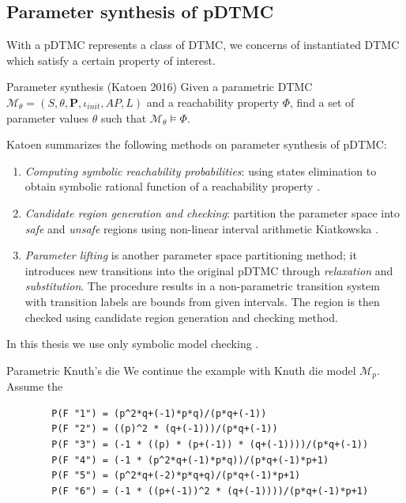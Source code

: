 \subsection{Parameter synthesis of pDTMC}
With a pDTMC represents a class of DTMC, we concerns of instantiated DTMC which satisfy a certain property of interest.
\begin{definition}{Parameter synthesis (Katoen 2016)\cite{katoen2016probabilistic}} Given a
      parametric DTMC $\mathcal{M}_\theta = (S, \theta, \mathbf{P}, \iota_{init}, AP, L)$ and a
      reachability property $\Phi$, find a set of parameter values $\theta$ such that
      $\mathcal{M}_\theta \models \Phi$.
\end{definition}
Katoen \cite{katoen2013model} summarizes the following methods on parameter synthesis of pDTMC:
\begin{enumerate}
      \item \textit{Computing symbolic reachability probabilities}: using states elimination to obtain symbolic
            rational function of a reachability property \cite{daws2004symbolic}
            \cite{hahn2011probabilistic}.
      \item \textit{Candidate region generation and checking}: partition the parameter space into \textit{safe}
            and \textit{unsafe} regions using non-linear interval arithmetic Kiatkowska \cite{kwiatkowska2006symmetry}.
      \item \textit{Parameter lifting} is another parameter space partitioning method; it introduces
            new transitions into the original pDTMC through \textit{relaxation} and
            \textit{substitution}. The procedure results in a non-parametric transition system with
            transition labels are bounds from given intervals. The region is then checked using
            candidate region generation and checking method.
\end{enumerate}
In this thesis we use only symbolic model checking \cite{daws2004symbolic}.
\begin{example}{Parametric Knuth's die}
      We continue the example with Knuth die model $\mathcal{M}_{p}$. Assume the
      \begin{lstlisting}
        P(F "1") = (p^2*q+(-1)*p*q)/(p*q+(-1))
        P(F "2") = ((p)^2 * (q+(-1)))/(p*q+(-1))
        P(F "3") = (-1 * ((p) * (p+(-1)) * (q+(-1))))/(p*q+(-1))
        P(F "4") = (-1 * (p^2*q+(-1)*p*q))/(p*q+(-1)*p+1)
        P(F "5") = (p^2*q+(-2)*p*q+q)/(p*q+(-1)*p+1)
        P(F "6") = (-1 * ((p+(-1))^2 * (q+(-1))))/(p*q+(-1)*p+1)
    \end{lstlisting}
\end{example}
